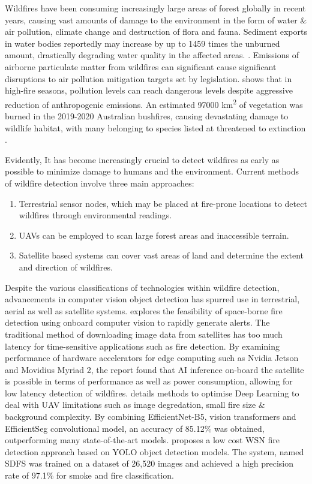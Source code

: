 \documentclass[lettersize,journal]{IEEEtran}
\begin{document}
Wildfires have been consuming increasingly large areas of forest globally in recent years, causing vast amounts of damage to the environment in the form of water \& air pollution, climate change and destruction of flora and fauna.
Sediment exports in water bodies reportedly may increase by up to 1459 times the unburned amount, drastically degrading water quality in the affected areas. \cite{wildfirewater}.
Emissions of airborne particulate matter from wildfires can significant cause significant disruptions to air pollution mitigation targets set by legislation. \cite{wildfireair} shows that in high-fire seasons, pollution levels can reach dangerous levels despite aggressive reduction of anthropogenic emissions.
An estimated 97000 km\textsuperscript{2} of vegetation was burned in the 2019-2020 Australian bushfires, causing devastating damage to wildlife habitat, with many belonging to species listed at threatened to extinction \cite{wildfireveg}.

Evidently, It has become increasingly crucial to detect wildfires as early as possible to minimize damage to humans and the environment. Current methods of wildfire detection involve three main approaches:
\begin{enumerate}
\item{Terrestrial sensor nodes, which may be placed at fire-prone locations to detect wildfires through environmental readings.}
\item{UAVs can be employed to scan large forest areas and inaccessible terrain.}
\item{Satellite based systems can cover vast areas of land and determine the extent and direction of wildfires.}
\end{enumerate}

Despite the various classifications of technologies within wildfire
detection, advancements in computer vision object detection has spurred
use in terrestrial, aerial as well as satellite systems. \cite{satellite}
explores the feasibility of space-borne fire detection using onboard
computer vision to rapidly generate alerts. The traditional method of
downloading image data from satellites has too much latency for
time-sensitive applications such as fire detection. By examining
performance of hardware accelerators for edge computing such as Nvidia
Jetson and Movidius Myriad 2, the report found that AI inference
on-board the satellite is possible in terms of performance as well as
power consumption, allowing for low latency detection of wildfires.
\cite{uavai} details methods to optimise Deep Learning to deal with UAV
limitations such as image degredation, small fire size \& background
complexity. By combining EfficientNet-B5, vision transformers and
EfficientSeg convolutional model, an accuracy of 85.12\% was obtained,
outperforming many state-of-the-art models. \cite{wsnyolo} proposes a low
cost WSN fire detection approach based on YOLO object detection models.
The system, named SDFS was trained on a dataset of 26,520 images and
achieved a high precision rate of 97.1\% for smoke and fire
classification.
\IEEEpubidadjcol
\end{document}
